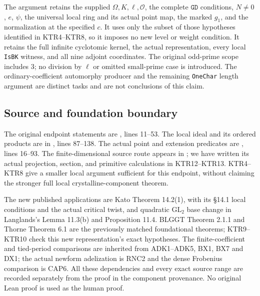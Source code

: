 The argument retains the supplied \(\Omega,K,\ell,\mathcal O\),
the complete \(\texttt{GD}\) conditions, \(N\ne0\),
\(e\), \(\psi\), the universal local ring and its actual
point map, the marked \(g_1\), and the normalization at the
specified \(c\).  It uses only the subset of those hypotheses
identified in KTR4--KTR8, so it imposes no new level or weight
condition.  It retains the full infinite cyclotomic kernel,
the actual representation, every local \texttt{IsBK} witness,
and all nine adjoint coordinates.  The original odd-prime
scope includes \(3\); no division by \(\ell\) or omitted
small-prime case is introduced.  The ordinary-coefficient
automorphy producer and the remaining \texttt{OneChar} length
argument are distinct tasks and are not conclusions of this
claim.

\subsection{Source and foundation boundary}

The original endpoint statements are
,
lines 11--53.  The local ideal and its ordered products are in
,
lines 87--138.  The actual point and extension predicates are
, lines 16--93.
The finite-dimensional source route appears in
;
we have written its actual projection, section, and primitive
calculations in KTR12--KTR13.  KTR4--KTR8 give a smaller local
argument sufficient for this endpoint, without claiming the
stronger full local crystalline-component theorem.

The new published applications are Kato Theorem 14.2(1), with
its \S14.1 local conditions and the actual critical twist, and
quadratic \(\mathrm{GL}_2\) base change in Langlands's
Lemma 11.3(b) and Proposition 11.4.  BLGGT Theorem 2.1.1 and
Thorne Theorem 6.1 are the previously matched foundational
theorems; KTR9--KTR10 check this new representation's exact
hypotheses.  The finite-coefficient and tied-period comparisons
are inherited from ADK1--ADK5, BX1, BX7 and DX1; the actual
newform adelization is RNC2 and the dense Frobenius comparison
is CAP6.  All these dependencies and every exact source range
are recorded separately from the proof in the component
provenance.  No original Lean proof is used as the human proof.
